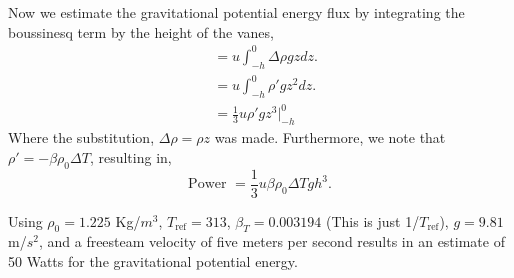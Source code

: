 \documentclass{article}
\begin{document}
Now we estimate the gravitational potential energy flux by integrating 
the boussinesq term by the height of the vanes, 
\begin{align*}
  & = u \int_{-h}^0 \Delta \rho g z dz. \\
  & = u \int_{-h}^0 \rho' g z^2 dz. \\
  & = \frac{1}{3} u \rho' g z^3 \bigg|_{-h}^{0}
\end{align*}
Where the substitution, $\Delta \rho = \rho z$ was made. Furthermore, we
note that $\rho' = -\beta \rho_0 \Delta T$, resulting in, 
%
%
\begin{equation}
 \text{Power } = \frac{1}{3} u \beta \rho_0 \Delta T g h^3.
\end{equation}

Using $\rho_0 = 1.225$ Kg/$m^3$, $T_{\text{ref}}=313$, $\beta_T = 0.003194$
(This is just 1/$T_{\text{ref}}$), $g=9.81$ m/$s^2$, and a freesteam
velocity of five meters per second results in an
estimate of 50 Watts for the gravitational potential energy. 

%
%

\end{document}
